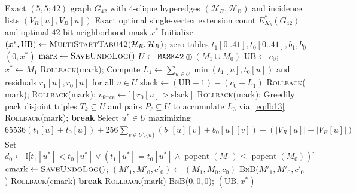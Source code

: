 \documentclass[11pt,a4paper]{article}
\theoremstyle{plain}
\theoremstyle{definition}
\DeclareMathOperator{\popcnt}{popcnt}
\begin{document}
\begin{algorithm}[htbp]
\caption{Bit-Parallel 42-Bit Hypergraph Branch-and-Bound with $L_1 + L_3$ Pigeonhole Pruning}
\label{alg:stitch42}
\footnotesize
\begin{algorithmic}[1]
\Require Exact $(5,5;42)$ graph $G_{42}$ with $4$-clique hyperedges $(\mathcal{H}_R, \mathcal{H}_B)$ and incidence lists $(V_R[u], V_B[u])$
\Ensure Exact optimal single-vertex extension count $E_{K_5}^*(G_{42})$ and optimal $42$-bit neighborhood mask $x^*$
\State Initialize $(x^*, \mathrm{UB}) \gets \textsc{MultiStartTabu42}(\mathcal{H}_R, \mathcal{H}_B)$; zero tables $t_1[0..41], t_0[0..41], b_1, b_0$
 \Return $(0, x^*)$ \EndIf
{}
  \State $\mathrm{mark} \gets \textsc{SaveUndoLog}()$
  \Loop
    \State $U \gets \mathtt{MASK42} \oplus (M_1 \cup M_0)$
       $\mathrm{UB} \gets c_0$;\; $x^* \gets M_1$ \EndIf
      \State \textsc{Rollback}($\mathrm{mark}$);\; \Return
    \EndIf
    \State Compute $L_1 \gets \sum_{u \in U} \min(t_1[u], t_0[u])$ and residuals $r_1[u], r_0[u]$ for all $u \in U$
    \State $\mathrm{slack} \gets (\mathrm{UB} - 1) - (c_0 + L_1)$
     \textsc{Rollback}($\mathrm{mark}$);\; \Return \EndIf
       \textsc{Rollback}($\mathrm{mark}$);\; \Return \EndIf
      \State $v_{\mathrm{force}} \gets \mathbb{I}[r_0[u] > \mathrm{slack}]$
       \textsc{Rollback}($\mathrm{mark}$);\; \Return \EndIf
    \Else
      \State Greedily pack disjoint triples $T_k \subseteq U$ and pairs $P_\ell \subseteq U$ to accumulate $L_3$ via~\eqref{eq:lb13}
       \textsc{Rollback}($\mathrm{mark}$);\; \Return \EndIf
      \State \textbf{break}
    \EndIf
  \EndLoop
  \State Select $u^* \in U$ maximizing $65536(t_1[u]+t_0[u]) + 256\sum_{v \in U \setminus \{u\}}(b_1[u][v]+b_0[u][v]) + (|V_R[u]|+|V_B[u]|)$
  \State Set $d_0 \gets \mathbb{I}\bigl[t_1[u^*] < t_0[u^*] \lor (t_1[u^*]=t_0[u^*] \land \popcnt(M_1) \le \popcnt(M_0))\bigr]$
    \State $\mathrm{cmark} \gets \textsc{SaveUndoLog}()$;\; $(M'_1, M'_0, c'_0) \gets (M_1, M_0, c_0)$
     \textsc{BnB}($M'_1, M'_0, c'_0$) \EndIf
    \State \textsc{Rollback}($\mathrm{cmark}$)
     \textbf{break} \EndIf
  \EndFor
  \State \textsc{Rollback}($\mathrm{mark}$)
\EndProcedure
\State \textsc{BnB}($0, 0, 0$);\; \Return $(\mathrm{UB}, x^*)$
\end{algorithmic}
\end{algorithm}
\end{document}
